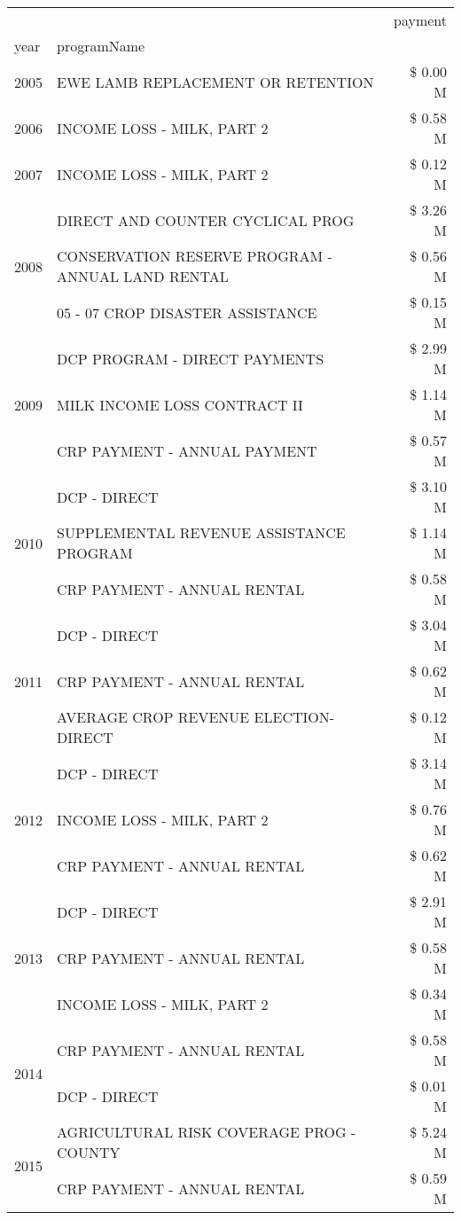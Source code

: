 \begin{tabular}{llr}
\toprule
 &  & payment \\
year & programName &  \\
\midrule
2005 & EWE LAMB REPLACEMENT OR RETENTION & \$ 0.00 M \\
\cline{1-3}
2006 & INCOME LOSS - MILK, PART 2 & \$ 0.58 M \\
\cline{1-3}
2007 & INCOME LOSS - MILK, PART 2 & \$ 0.12 M \\
\cline{1-3}
\multirow[t]{3}{*}{2008} & DIRECT AND COUNTER CYCLICAL PROG & \$ 3.26 M \\
 & CONSERVATION RESERVE PROGRAM - ANNUAL LAND RENTAL & \$ 0.56 M \\
 & 05 - 07 CROP DISASTER ASSISTANCE & \$ 0.15 M \\
\cline{1-3}
\multirow[t]{3}{*}{2009} & DCP PROGRAM - DIRECT PAYMENTS & \$ 2.99 M \\
 & MILK INCOME LOSS CONTRACT II & \$ 1.14 M \\
 & CRP PAYMENT - ANNUAL PAYMENT & \$ 0.57 M \\
\cline{1-3}
\multirow[t]{3}{*}{2010} & DCP - DIRECT & \$ 3.10 M \\
 & SUPPLEMENTAL REVENUE ASSISTANCE PROGRAM & \$ 1.14 M \\
 & CRP PAYMENT - ANNUAL RENTAL & \$ 0.58 M \\
\cline{1-3}
\multirow[t]{3}{*}{2011} & DCP - DIRECT & \$ 3.04 M \\
 & CRP PAYMENT - ANNUAL RENTAL & \$ 0.62 M \\
 & AVERAGE CROP REVENUE ELECTION-DIRECT & \$ 0.12 M \\
\cline{1-3}
\multirow[t]{3}{*}{2012} & DCP - DIRECT & \$ 3.14 M \\
 & INCOME LOSS - MILK, PART 2 & \$ 0.76 M \\
 & CRP PAYMENT - ANNUAL RENTAL & \$ 0.62 M \\
\cline{1-3}
\multirow[t]{3}{*}{2013} & DCP - DIRECT & \$ 2.91 M \\
 & CRP PAYMENT - ANNUAL RENTAL & \$ 0.58 M \\
 & INCOME LOSS - MILK, PART 2 & \$ 0.34 M \\
\cline{1-3}
\multirow[t]{2}{*}{2014} & CRP PAYMENT - ANNUAL RENTAL & \$ 0.58 M \\
 & DCP - DIRECT & \$ 0.01 M \\
\cline{1-3}
\multirow[t]{2}{*}{2015} & AGRICULTURAL RISK COVERAGE PROG - COUNTY & \$ 5.24 M \\
 & CRP PAYMENT - ANNUAL RENTAL & \$ 0.59 M \\

\end{tabular}
